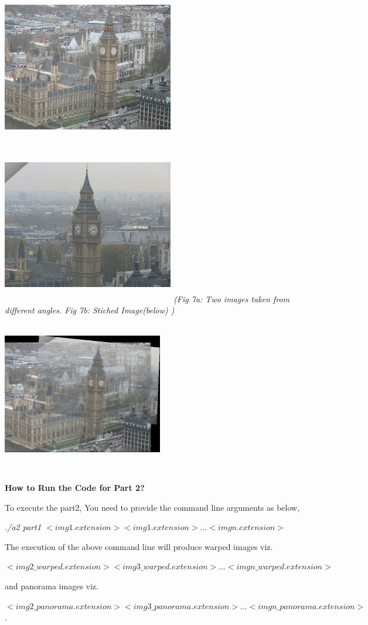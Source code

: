 \documentclass{article}
\begin{document}
\begin{enumerate}
\begin{center}
					\includegraphics[height=7cm,width=7.5cm]{444a} \includegraphics[height=7cm,width=7.5cm]{444b} 
					\textit{	(Fig 7a: Two images taken from different angles. Fig 7b: Stiched Image(below) )} \\
					\includegraphics[height=7cm,width=7cm]{444c}  \\
				\end{center}
					
						\textbf{How to Run the Code for Part 2?}
						
						To execute the part2, You need to provide the command line arguments as below,
						
						\textit{./a2 part1 $<img1.extension>  <img1.extension> ...<imgn.extension> $}
						
						The execution of the above command line will produce warped images viz. 
						
						$<img2\_warped.extension>  < img3\_warped.extension> ...<imgn\_warped.extension> $
						
						and panorama images viz. 
						
						$<img2\_panorama.extension>  < img3\_panorama.extension> ...<imgn\_panorama.extension> $.
			\end{enumerate}
			
\end{document}

